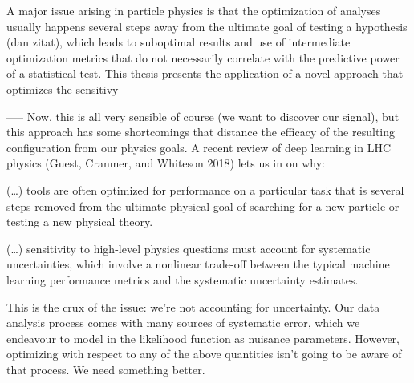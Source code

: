 A major issue arising in particle physics is that the optimization of analyses usually happens several steps away from the ultimate goal of testing a hypothesis (dan zitat), which leads to suboptimal results and use of intermediate optimization metrics that do not necessarily correlate with the predictive power of a statistical test. This thesis presents the application of a novel approach that optimizes the sensitivy 

\citep{guest2018deep}
-----
Now, this is all very sensible of course (we want to discover our signal), but this approach has some shortcomings that distance the efficacy of the resulting configuration from our physics goals. A recent review of deep learning in LHC physics (Guest, Cranmer, and Whiteson 2018) lets us in on why:

    (…) tools are often optimized for performance on a particular task that is several steps removed from the ultimate physical goal of searching for a new particle or testing a new physical theory.

    (…) sensitivity to high-level physics questions must account for systematic uncertainties, which involve a nonlinear trade-off between the typical machine learning performance metrics and the systematic uncertainty estimates.

This is the crux of the issue: we’re not accounting for uncertainty. Our data analysis process comes with many sources of systematic error, which we endeavour to model in the likelihood function as nuisance parameters. However, optimizing with respect to any of the above quantities isn’t going to be aware of that process. We need something better.











